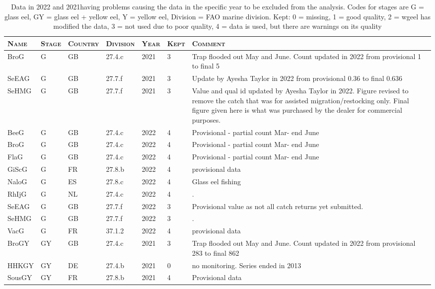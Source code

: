 \begin{table}[htbp]
\centering
\caption{Data in 2022 and 2021having problems causing the data in the specific year to be excluded from the analysis. Codes for stages are G = glass eel, GY = glass eel + yellow eel, Y = yellow eel, Division = FAO marine division. Kept: 0 = missing, 1 = good quality,
						2 = wgeel has modified the data, 3 = not used due to poor quality, 4 =	data is used, but there are warnings on its quality} 
\label{table_series_prob}
\begin{tabular}{p{1.5cm}p{1.5cm}p{1.5cm}p{1cm}p{1cm}p{1cm}p{8cm}}
  \hline
\scshape{Name} & \scshape{Stage} & \scshape{Country} & \scshape{Division} & \scshape{Year} & \scshape{Kept} & \scshape{Comment} \\ 
  \hline
BroG & G & GB & 27.4.c & 2021 &   3 & Trap flooded out May and June. Count updated in 2022 from provisional 1 to final 5 \\ 
  SeEAG & G & GB & 27.7.f & 2021 &   3 & Update by Ayesha Taylor in 2022 from provisional 0.36 to final 0.636 \\ 
  SeHMG & G & GB & 27.7.f & 2021 &   3 & Value and qual id updated by Ayesha Taylor in 2022. Figure revised to remove the catch that was for assisted migration/restocking only. Final figure given here is what was purchased by the dealer for commercial purposes. \\ 
  BeeG & G & GB & 27.4.c & 2022 &   4 & Provisional - partial count Mar- end June \\ 
  BroG & G & GB & 27.4.c & 2022 &   4 & Provisional - partial count Mar- end June \\ 
  FlaG & G & GB & 27.4.c & 2022 &   4 & Provisional - partial count Mar- end June \\ 
  GiScG & G & FR & 27.8.b & 2022 &   4 & provisional data \\ 
  NaloG & G & ES & 27.8.c & 2022 &   4 & Glass eel fishing \\ 
  RhIjG & G & NL & 27.4.c & 2022 &   4 & . \\ 
  SeEAG & G & GB & 27.7.f & 2022 &   3 & Provisional value as not all catch returns yet submitted. \\ 
  SeHMG & G & GB & 27.7.f & 2022 &   3 & . \\ 
  VacG & G & FR & 37.1.2 & 2022 &   4 & provisional data \\ 
  BroGY & GY & GB & 27.4.c & 2021 &   3 & Trap flooded out May and June. Count updated in 2022 from provisional 283 to final 862 \\ 
  HHKGY & GY & DE & 27.4.b & 2021 &   0 & no monitoring. Series ended in 2013 \\ 
  SousGY & GY & FR & 27.8.b & 2021 &   4 & Provisional data \\ 
   \hline
\end{tabular}
\end{table}
